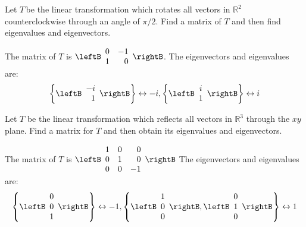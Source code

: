 \begin{enumialphparenastyle}
\begin{ex} Let $T\,$be the linear transformation which rotates all vectors in 
$\mathbb{R}^{2}$ counterclockwise through an angle of $\pi /2.$ Find a matrix
of $T$ and then find eigenvalues and eigenvectors.
\begin{sol}
The matrix of $T$ is $\leftB
\begin{array}{rr}
0 & -1 \\
1 & 0
\end{array}
\rightB$. The eigenvectors and eigenvalues are:
\[
\left\{ \leftB
\begin{array}{r}
-i \\
1
\end{array}
\rightB \right\} \leftrightarrow -i,\left\{ \leftB
\begin{array}{c}
i \\
1
\end{array}
\rightB \right\} \leftrightarrow i
\]
\end{sol}
\end{ex}

\begin{ex} Let $T$ be the linear transformation which reflects all vectors in $
\mathbb{R}^{3}$ through the $xy$ plane. Find a matrix for $T$ and then
obtain its eigenvalues and eigenvectors. 
\begin{sol}
The matrix of $T$ is $\leftB
\begin{array}{rrr}
1 & 0 & 0 \\
0 & 1 & 0 \\
0 & 0 & -1
\end{array}
\rightB$
The eigenvectors and eigenvalues are:
\[
\left\{ \leftB
\begin{array}{c}
0 \\
0 \\
1
\end{array}
\rightB \right\} \leftrightarrow -1,\left\{ \leftB
\begin{array}{c}
1 \\
0 \\
0
\end{array}
\rightB ,\leftB
\begin{array}{c}
0 \\
1 \\
0
\end{array}
\rightB \right\} \leftrightarrow 1
\]
\end{sol}
\end{ex}

\end{enumialphparenastyle}